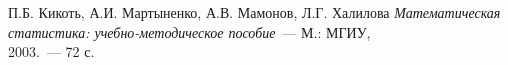 \newpage
\renewcommand{\bibname}{Список литературы и интернет-ресурсов}
\begin{thebibliography}{2009}

П.Б. Кикоть, А.И. Мартыненко, А.В. Мамонов, Л.Г. Халилова
{\em Математическая статистика: учебно-методическое пособие}~--- М.:
МГИУ, \\2003.~--- 72 с.

\end{thebibliography}

\endinput
